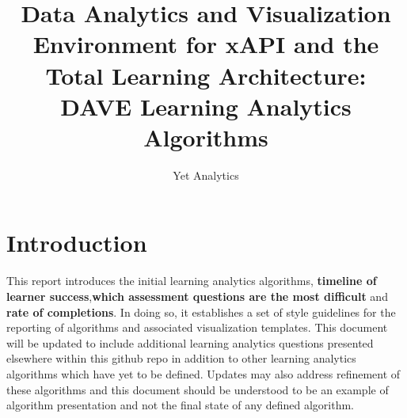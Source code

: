 \documentclass{article}
\title{Data Analytics and Visualization Environment for xAPI and the Total Learning Architecture: DAVE Learning Analytics Algorithms}
\author{Yet Analytics}
\begin{document}
\begin{titlepage}
  \maketitle
\end{titlepage}

\section*{Introduction}
This report introduces the initial learning analytics algorithms,
\textbf{timeline of learner success},\textbf{which assessment
  questions are the most difficult} and \textbf{rate of completions}.
In doing so, it establishes a set of style
guidelines for the reporting of algorithms and associated visualization templates.
This document will be updated to include additional learning analytics
questions presented elsewhere within this github repo in addition to other learning
analytics algorithms which have yet to be defined. Updates may also
address refinement of these algorithms and this document should be
understood to be an example of algorithm presentation and not the
final state of any defined algorithm.
\end{document}

